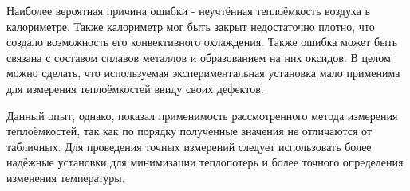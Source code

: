 \documentclass[a4paper,12pt]{article} %
\begin{document}
Наиболее вероятная причина ошибки - неучтённая теплоёмкость воздуха в калориметре. Также калориметр мог быть закрыт недостаточно плотно, что создало возможность его конвективного охлаждения. Также ошибка может быть связана с составом сплавов металлов и образованием на них оксидов. В целом можно сделать, что используемая экспериментальная установка мало применима для измерения теплоёмкостей ввиду своих дефектов.

Данный опыт, однако, показал применимость рассмотренного метода измерения теплоёмкостей, так как по порядку полученные значения не отличаются от табличных. Для проведения точных измерений следует использовать более надёжные установки для минимизации теплопотерь и более точного определения изменения температуры. 
\end{document}
